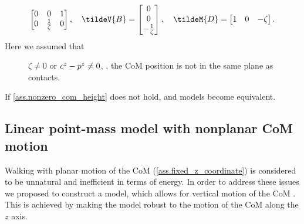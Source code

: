 \begin{enumerate}
\begin{equation}
\begin{bmatrix}
                0   &  0  &  1 \\
                0   &  \frac{1}{\zeta}   &  0   \\
            \end{bmatrix},
            \quad
            \tildeV{B}
            =
            \begin{bmatrix}
                0   \\
                0   \\
                -\frac{1}{\zeta}\\
            \end{bmatrix}
            , \quad
            \tildeM{D}
            =
            \begin{bmatrix}
                1 & 0 &  - \zeta
            \end{bmatrix}
            .
        \end{equation}
        Here we assumed that
        \begin{description}
            \item[] $\zeta \ne 0$ or $c^z -
                p^z \ne 0$, \IE, the \ac{CoM} position is not in
                the same plane as contacts.
        \end{description}
        If \cref{ass.nonzero_com_height} does not hold, 
        and  models become equivalent.
\end{enumerate}
%



\subsection{Linear point-mass model with nonplanar CoM motion}\label{sec.point_mass_nonplanar}

Walking with planar motion of the \ac{CoM} (\cref{ass.fixed_z_coordinate}) is
considered to be unnatural and inefficient in terms of energy. In order to
address these issues we proposed to construct a model, which allows for
vertical motion of the \ac{CoM} \cite{Brasseur2015humanoids}. This is achieved
by making the model robust to the motion of the \ac{CoM} along the $z$ axis.



